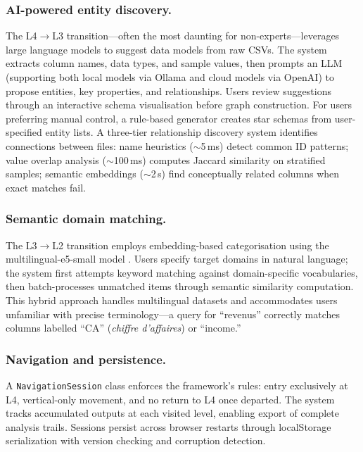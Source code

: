 \documentclass[12pt,a4paper]{article}
\begin{document}
\subsubsection{AI-powered entity discovery.}
The L4$\to$L3 transition---often the most daunting for non-experts---leverages large language models to suggest data models from raw CSVs. The system extracts column names, data types, and sample values, then prompts an LLM (supporting both local models via Ollama and cloud models via OpenAI) to propose entities, key properties, and relationships. Users review suggestions through an interactive schema visualisation before graph construction. For users preferring manual control, a rule-based generator creates star schemas from user-specified entity lists. A three-tier relationship discovery system identifies connections between files: name heuristics ($\sim$5\,ms) detect common ID patterns; value overlap analysis ($\sim$100\,ms) computes Jaccard similarity on stratified samples; semantic embeddings ($\sim$2\,s) find conceptually related columns when exact matches fail.

\subsubsection{Semantic domain matching.}
The L3$\to$L2 transition employs embedding-based categorisation using the multilingual-e5-small model \citep{wang2024}. Users specify target domains in natural language; the system first attempts keyword matching against domain-specific vocabularies, then batch-processes unmatched items through semantic similarity computation. This hybrid approach handles multilingual datasets and accommodates users unfamiliar with precise terminology---a query for ``revenus'' correctly matches columns labelled ``CA'' (\textit{chiffre d'affaires}) or ``income.''

\subsubsection{Navigation and persistence.}
A \texttt{NavigationSession} class enforces the framework's rules: entry exclusively at L4, vertical-only movement, and no return to L4 once departed. The system tracks accumulated outputs at each visited level, enabling export of complete analysis trails. Sessions persist across browser restarts through localStorage serialization with version checking and corruption detection.
\end{document}
